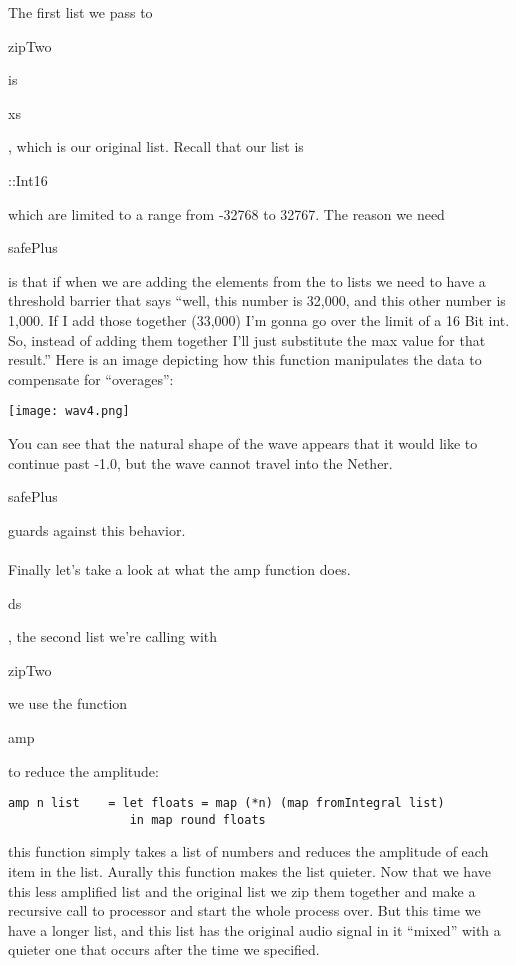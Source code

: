 \documentclass[12pt]{article}
\begin{document}
The first list we pass to \begin{tt}zipTwo\end{tt} is \begin{tt}xs\end{tt}, which is our original list. Recall that our list is \begin{tt}::Int16\end{tt} which are limited to a range from -32768 to 32767. The reason we need \begin{tt}safePlus\end{tt} is that if when we are adding the elements from the to lists we need to have a threshold barrier that says ``well, this number is 32,000, and this other number is 1,000. If I add those together (33,000) I'm gonna go over the limit of a 16 Bit int. So, instead of adding them together I'll just substitute the max value for that result.'' Here is an image depicting how this function manipulates the data to compensate for ``overages'':
\begin{center}
\texttt{[image: wav4.png]}
\end{center}
You can see that the natural shape of the wave appears that it would like to continue past -1.0, but the wave cannot travel into the Nether. \begin{tt}safePlus\end{tt} guards against this behavior. 
\\ \\
Finally let's take a look at what the amp function does. \begin{tt}ds\end{tt}, the second list we're calling with \begin{tt}zipTwo\end{tt} we use the function \begin{tt}amp\end{tt} to reduce the amplitude:
\begin{verbatim}
amp n list    = let floats = map (*n) (map fromIntegral list)
                 in map round floats
\end{verbatim}
this function simply takes a list of numbers and reduces the amplitude of each item in the list. Aurally this function makes the list quieter. Now that we have this less amplified list and the original list we zip them together and make a recursive call to processor and start the whole process over. But this time we have a longer list, and this list has the original audio signal in it ``mixed'' with a quieter one that occurs after the time we specified.
\end{document}
